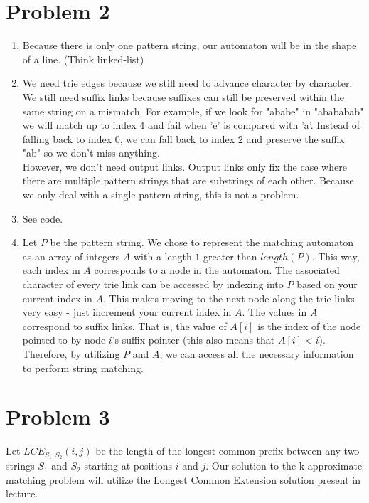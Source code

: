 \documentclass{article}
\theoremstyle{casestyle}
\begin{document}
\section *{Problem 2}
\begin{enumerate}[i]
    \item 
    Because there is only one pattern string, our automaton will be in the shape of a line. (Think linked-list)

    \item 
    We need trie edges because we still need to advance character by character. We still need suffix links because suffixes can still be preserved within the same string on a mismatch. For example, if we look for "ababe" in "abababab" we will match up to index $4$ and fail when 'e' is compared with 'a'. Instead of falling back to index $0$, we can fall back to index $2$ and preserve the suffix "ab" so we don't miss anything.\\
    
    However, we don't need output links. Output links only fix the case where there are multiple pattern strings that are substrings of each other. Because we only deal with a single pattern string, this is not a problem.\\
    
    \item 
    See code.
    
    \item 
    Let $P$ be the pattern string. We chose to represent the matching automaton as an array of integers $A$ with a length $1$ greater than $length(P)$. This way, each index in $A$ corresponds to a node in the automaton. The associated character of every trie link can be accessed by indexing into $P$ based on your current index in $A$. This makes moving to the next node along the trie links very easy - just increment your current index in $A$. The values in $A$ correspond to suffix links. That is, the value of $A[i]$ is the index of the node pointed to by node $i$'s suffix pointer (this also means that $A[i] < i$). Therefore, by utilizing $P$ and $A$, we can access all the necessary information to perform string matching.\\
    
    
\end{enumerate}


\section *{Problem 3}
Let $LCE_{S_1, S_2}(i, j)$ be the length of the longest common prefix between any two strings $S_1$ and $S_2$ starting at positions $i$ and $j$. Our solution to the k-approximate matching problem will utilize the Longest Common Extension solution present in lecture.\\
\end{document}
